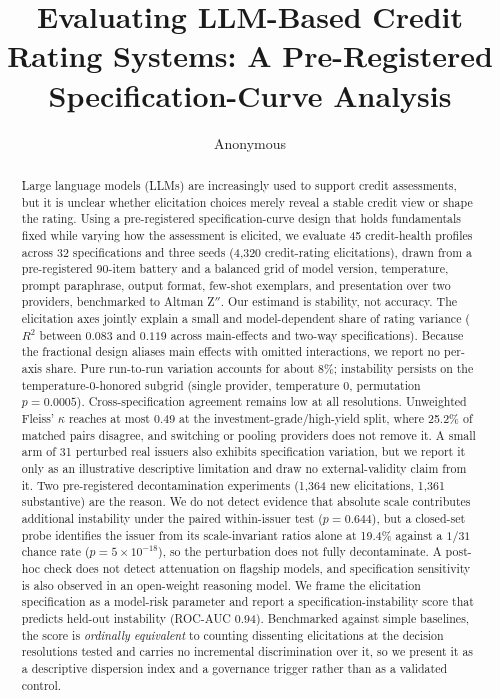\documentclass[a4paper,fleqn]{cas-sc}
\begin{document}
\let\WriteBookmarks\relax
\def\floatpagepagefraction{1}
\def\textpagefraction{.001}


\title[mode=title]{Evaluating LLM-Based Credit Rating Systems: A Pre-Registered Specification-Curve Analysis}

\author[1]{Anonymous}


\begin{abstract}
Large language models (LLMs) are increasingly used to support credit assessments, but it is unclear
whether elicitation choices merely reveal a stable credit view or shape the rating. Using a pre-registered
specification-curve design that holds fundamentals fixed while varying how the assessment is elicited, we
evaluate 45 credit-health profiles across 32 specifications and three seeds (4{,}320 credit-rating
elicitations), drawn from a pre-registered 90-item battery and a balanced grid of model version,
temperature, prompt paraphrase, output format, few-shot exemplars, and presentation over two providers,
benchmarked to Altman Z$''$. Our estimand is stability,
not accuracy. The elicitation axes
jointly explain a small and model-dependent share of rating variance ($R^2$ between $0.083$ and
$0.119$ across main-effects and two-way specifications). Because the fractional design aliases main
effects with omitted interactions, we report no per-axis share. Pure run-to-run variation accounts
for about 8\%; instability persists on the
temperature-0-honored subgrid (single provider,
temperature 0, permutation $p=0.0005$). Cross-specification agreement remains low at all resolutions. Unweighted Fleiss' $\kappa$ reaches at most 0.49 at the investment-grade/high-yield split, where 25.2\% of
matched pairs disagree, and switching or pooling providers does not remove it. A small arm of 31 perturbed real issuers also exhibits specification variation, but we report it only as an illustrative descriptive limitation and draw
no external-validity claim from it. Two pre-registered decontamination experiments
(1{,}364 new elicitations, 1{,}361 substantive) are the reason. We do not detect evidence that absolute scale contributes additional
instability under the paired within-issuer test ($p=0.644$), but a closed-set probe identifies the
issuer from its scale-invariant ratios alone at 19.4\% against a $1/31$ chance rate
($p=5{\times}10^{-18}$), so the perturbation does not fully decontaminate. A post-hoc check does not detect attenuation on flagship
models, and specification sensitivity is also observed in an open-weight reasoning model. We frame the
elicitation specification as a model-risk parameter and report a specification-instability score that
predicts held-out instability (ROC-AUC 0.94). Benchmarked against simple
baselines, the score is \emph{ordinally equivalent} to counting dissenting elicitations at the
decision resolutions tested and carries no incremental discrimination over it, so we present it as a
descriptive dispersion index and a governance trigger rather than as a validated control.
\end{abstract}
\end{document}
